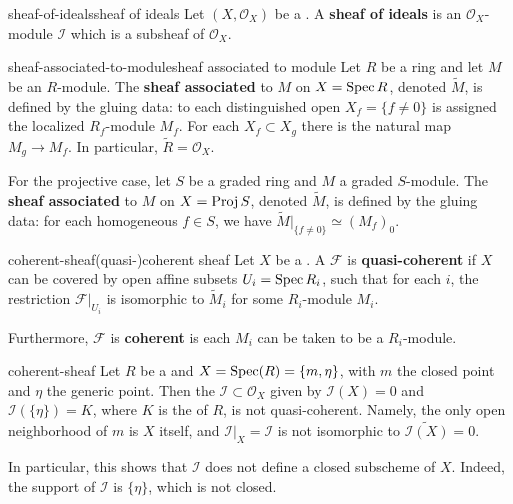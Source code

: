 \begin{topic}{sheaf-of-ideals}{sheaf of ideals}
    Let $(X, \mathcal{O}_X)$ be a . A \textbf{sheaf of ideals} is an $\mathcal{O}_X$-module $\mathcal{I}$ which is a subsheaf of $\mathcal{O}_X$.
\end{topic}

\begin{topic}{sheaf-associated-to-module}{sheaf associated to module}
    Let $R$ be a ring and let $M$ be an $R$-module. The \textbf{sheaf associated} to $M$ on $X = \operatorname{Spec} R$, denoted $\tilde{M}$, is defined by the gluing data: to each distinguished open $X_f = \{ f \ne 0 \}$ is assigned the localized $R_f$-module $M_f$. For each $X_f \subset X_g$ there is the natural map $M_g \to M_f$. In particular, $\tilde{R} = \mathcal{O}_X$.
    
    For the projective case, let $S$ be a graded ring and $M$ a graded $S$-module. The \textbf{sheaf associated} to $M$ on $X = \operatorname{Proj} S$, denoted $\tilde{M}$, is defined by the gluing data: for each homogeneous $f \in S$, we have $\tilde{M}|_{\{ f \ne 0\}} \simeq (M_f)_0$.
\end{topic}

\begin{topic}{coherent-sheaf}{(quasi-)coherent sheaf}
    Let $X$ be a . A  $\mathcal{F}$ is \textbf{quasi-coherent} if $X$ can be covered by open affine subsets $U_i = \operatorname{Spec} R_i$, such that for each $i$, the restriction $\mathcal{F}|_{U_i}$ is isomorphic to $\tilde{M}_i$ for some $R_i$-module $M_i$.
    
    Furthermore, $\mathcal{F}$ is \textbf{coherent} is each $M_i$ can be taken to be a  $R_i$-module.
\end{topic}

\begin{example}{coherent-sheaf}
    Let $R$ be a  and $X = \operatorname{Spec}(R) = \{ m, \eta \}$, with $m$ the closed point and $\eta$ the generic point. Then the  $\mathcal{I} \subset \mathcal{O}_X$ given by $\mathcal{I}(X) = 0$ and $\mathcal{I}(\{ \eta \}) = K$, where $K$ is the  of $R$, is not quasi-coherent. Namely, the only open neighborhood of $m$ is $X$ itself, and $\mathcal{I}|_X = \mathcal{I}$ is not isomorphic to $\widetilde{\mathcal{I}(X)} = 0$.
    
    In particular, this shows that $\mathcal{I}$ does not define a closed subscheme of $X$. Indeed, the support of $\mathcal{I}$ is $\{ \eta \}$, which is not closed.
\end{example}

